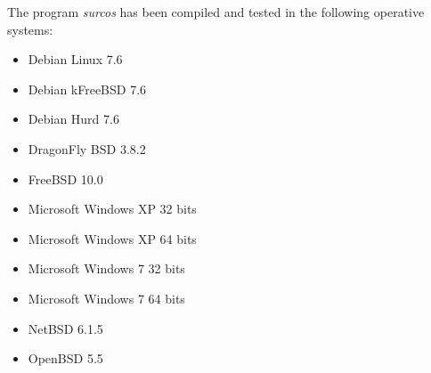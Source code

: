 The program \emph{surcos} has been compiled and tested in the following
operative systems:
\begin{itemize}
\item Debian Linux 7.6
\item Debian kFreeBSD 7.6
\item Debian Hurd 7.6
\item DragonFly BSD 3.8.2
\item FreeBSD 10.0
\item Microsoft Windows XP 32 bits
\item Microsoft Windows XP 64 bits
\item Microsoft Windows 7 32 bits
\item Microsoft Windows 7 64 bits
\item NetBSD 6.1.5
\item OpenBSD 5.5
\end{itemize}

